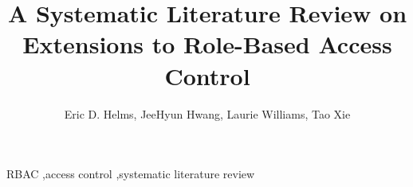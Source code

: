 \documentclass[3p,12pt]{elsarticle}
\begin{document}
\begin{frontmatter}

\title{A Systematic Literature Review on Extensions to Role-Based Access Control}
	
\author{Eric D. Helms, JeeHyun Hwang, Laurie Williams, Tao Xie}
\address{North Carolina State University}
\address{Department of Computer Science}
\address{890 Oval Drive, Box 8206}
\address{Raleigh, NC 27695-2858}




\begin{keyword}
RBAC \sep access control \sep systematic literature review
\end{keyword}

\end{frontmatter}




		










\end{document}
